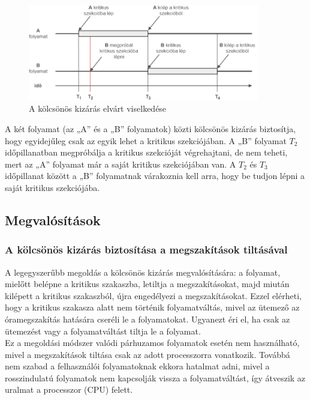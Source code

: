 \documentclass[tikz,12pt,margin=0px]{article}
\begin{document}
	\begin{figure}[H]
		\centering
		\includegraphics[width=0.9\textwidth]{img/mutex.png}
		\caption{A kölcsönös kizárás elvárt viselkedése}
	\end{figure}

    \noindent A két folyamat (az „A” és a „B” folyamatok) közti kölcsönös kizárás biztosítja, hogy egyidejűleg csak az egyik lehet a kritikus szekciójában. A „B” folyamat $T_2$ időpillanatban megpróbálja a kritikus szekcióját végrehajtani, de nem teheti, mert az „A” folyamat már a saját kritikus szekciójában van. A $T_2$ és  $T_3$ időpillanat között a „B” folyamatnak várakoznia kell arra, hogy be tudjon lépni a saját kritikus szekciójába.

	\subsection*{Megvalósítások}
	
    \subsubsection*{A kölcsönös kizárás biztosítása a megszakítások tiltásával}

    A legegyszerűbb megoldás a kölcsönös kizárás megvalósítására: a folyamat, mielőtt belépne a kritikus szakaszba, letiltja a megszakításokat, majd miután kilépett a kritikus szakaszból, újra engedélyezi a megszakításokat. Ezzel elérheti, hogy a kritikus szakasza alatt nem történik folyamatváltás, mivel az ütemező az óramegszakítás hatására cseréli le a folyamatokat. Ugyanezt éri el, ha csak az ütemezést vagy a folyamatváltást tiltja le a folyamat.\\

    \noindent Ez a megoldási módszer valódi párhuzamos folyamatok esetén nem használható, mivel a megszakítások tiltása csak az adott processzorra vonatkozik. Továbbá nem szabad a felhasználói folyamatoknak ekkora hatalmat adni, mivel a rosszindulatú folyamatok nem kapcsolják vissza a folyamatváltást, így átveszik az uralmat a processzor (CPU) felett.\\
\end{document}
